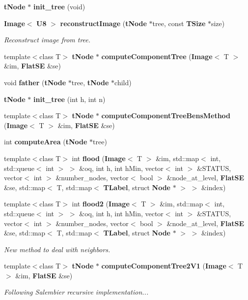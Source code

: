 \begin{CompactItemize}
\item 
{\bf t\-Node} $\ast$ {\bf init\_\-tree} (void)
\item 
{\bf Image}$<$ {\bf U8} $>$ {\bf reconstruct\-Image} ({\bf t\-Node} $\ast$tree, const {\bf TSize} $\ast$size)
\begin{CompactList}\small\item\em Reconstruct image from tree. \item\end{CompactList}\item 
template$<$class T$>$ {\bf t\-Node} $\ast$ {\bf compute\-Component\-Tree} ({\bf Image}$<$ T $>$ \&im, {\bf Flat\-SE} \&se)
\item 
void {\bf father} ({\bf t\-Node} $\ast$tree, {\bf t\-Node} $\ast$child)
\item 
{\bf t\-Node} $\ast$ {\bf init\_\-tree} (int h, int n)
\item 
template$<$class T$>$ {\bf t\-Node} $\ast$ {\bf compute\-Component\-Tree\-Bens\-Method} ({\bf Image}$<$ T $>$ \&im, {\bf Flat\-SE} \&se)
\item 
int {\bf compute\-Area} ({\bf t\-Node} $\ast$tree)
\item 
template$<$class T$>$ int {\bf flood} ({\bf Image}$<$ T $>$ \&im, std::map$<$ int, std::queue$<$ int $>$ $>$ \&oq, int h, int h\-Min, vector$<$ int $>$ \&STATUS, vector$<$ int $>$ \&number\_\-nodes, vector$<$ bool $>$ \&node\_\-at\_\-level, {\bf Flat\-SE} \&se, std::map$<$ T, std::map$<$ {\bf TLabel}, struct {\bf Node} $\ast$ $>$ $>$ \&index)
\item 
template$<$class T$>$ int {\bf flood2} ({\bf Image}$<$ T $>$ \&im, std::map$<$ int, std::queue$<$ int $>$ $>$ \&oq, int h, int h\-Min, vector$<$ int $>$ \&STATUS, vector$<$ int $>$ \&number\_\-nodes, vector$<$ bool $>$ \&node\_\-at\_\-level, {\bf Flat\-SE} \&se, std::map$<$ T, std::map$<$ {\bf TLabel}, struct {\bf Node} $\ast$ $>$ $>$ \&index)
\begin{CompactList}\small\item\em New method to deal with neighbors. \item\end{CompactList}\item 
template$<$class T$>$ {\bf t\-Node} $\ast$ {\bf compute\-Component\-Tree2V1} ({\bf Image}$<$ T $>$ \&im, {\bf Flat\-SE} \&se)
\begin{CompactList}\small\item\em Following Salembier recursive implementation... \item\end{CompactList}\item 

\end{CompactItemize}
